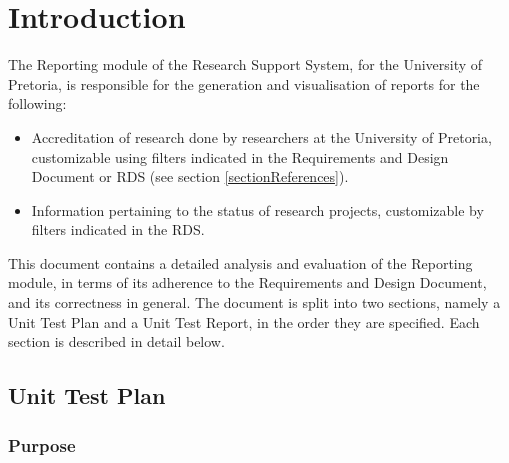 \section{Introduction}
The Reporting module of the Research Support System, for the University of Pretoria, is responsible for the generation and visualisation of reports for the following:
\begin{itemize}
	\item Accreditation of research done by researchers at the University of Pretoria, customizable using filters indicated in the Requirements and Design Document or RDS (see section \ref{sectionReferences}).
	\item Information pertaining to the status of research projects, customizable by filters indicated in the RDS.
\end{itemize}
This document contains a detailed analysis and evaluation of the Reporting module, in terms of its adherence to the Requirements and Design Document, and its correctness in general. 
The document is split into two sections, namely a Unit Test Plan and a Unit Test Report, in the order they are specified. Each section is described in detail below.


\subsection{Unit Test Plan}
\subsubsection{Purpose}

